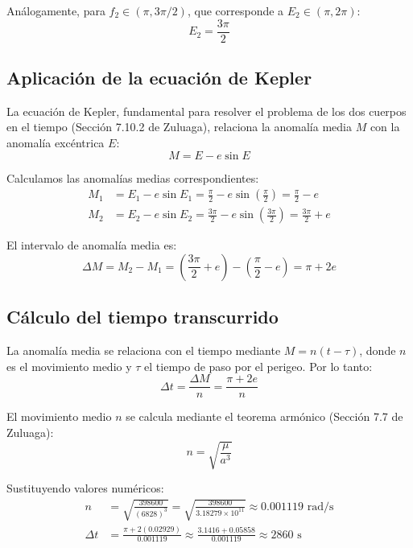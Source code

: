 \documentclass[12pt, a4paper]{article}
\begin{document}
Análogamente, para $f_2 \in (\pi, 3\pi/2)$, que corresponde a $E_2 \in (\pi, 2\pi)$:
\begin{equation}
    E_2 = \frac{3\pi}{2}
\end{equation}

\subsection*{Aplicación de la ecuación de Kepler}

La ecuación de Kepler, fundamental para resolver el problema de los dos cuerpos en el tiempo (Sección 7.10.2 de Zuluaga), relaciona la anomalía media $M$ con la anomalía excéntrica $E$:
\begin{equation}
    M = E - e\sin E
\end{equation}

Calculamos las anomalías medias correspondientes:
\begin{align}
    M_1 &= E_1 - e\sin E_1 = \frac{\pi}{2} - e\sin\left(\frac{\pi}{2}\right) = \frac{\pi}{2} - e \\
    M_2 &= E_2 - e\sin E_2 = \frac{3\pi}{2} - e\sin\left(\frac{3\pi}{2}\right) = \frac{3\pi}{2} + e
\end{align}

El intervalo de anomalía media es:
\begin{equation}
    \Delta M = M_2 - M_1 = \left(\frac{3\pi}{2} + e\right) - \left(\frac{\pi}{2} - e\right) = \pi + 2e
\end{equation}

\subsection*{Cálculo del tiempo transcurrido}

La anomalía media se relaciona con el tiempo mediante $M = n(t - \tau)$, donde $n$ es el movimiento medio y $\tau$ el tiempo de paso por el perigeo. Por lo tanto:
\begin{equation}
    \Delta t = \frac{\Delta M}{n} = \frac{\pi + 2e}{n}
\end{equation}

El movimiento medio $n$ se calcula mediante el teorema armónico (Sección 7.7 de Zuluaga):
\begin{equation}
    n = \sqrt{\frac{\mu}{a^3}}
\end{equation}

Sustituyendo valores numéricos:
\begin{align}
    n &= \sqrt{\frac{398600}{(6828)^3}} = \sqrt{\frac{398600}{3.18279 \times 10^{11}}} \approx 0.001119 \text{ rad/s} \\
    \Delta t &= \frac{\pi + 2(0.02929)}{0.001119} \approx \frac{3.1416 + 0.05858}{0.001119} \approx 2860 \text{ s}
\end{align}
\end{document}
